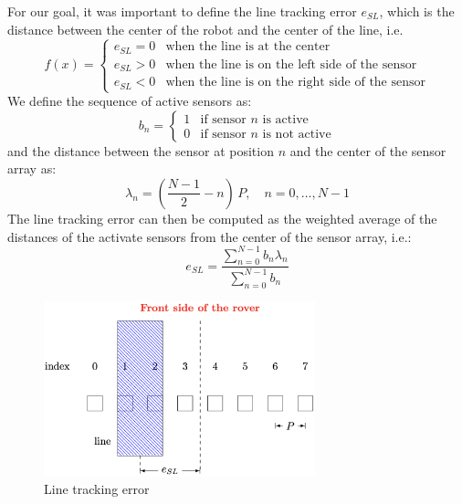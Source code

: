 For our goal, it was important to define the line tracking error $e_{SL}$, which is the distance between the center of the robot and the center of the line, i.e.
\begin{equation}
    f(x) = \left\{
    \begin{array}{ll}
        e_{SL} = 0 & \text{when the line is at the center} \\
        e_{SL} > 0 & \text{when the line is on the left side of the sensor} \\
        e_{SL} < 0 & \text{when the line is on the right side of the sensor}
    \end{array}
    \right.
\end{equation}
We define the sequence of active sensors as:
\begin{equation}
    b_n = 
    \begin{cases}
        1 & \text{if sensor $n$ is active} \\
        0 & \text{if sensor $n$ is not active}
    \end{cases}
\end{equation}
and the distance between the sensor at position $n$ and the center of the sensor array as:
\begin{equation}
    \lambda_n = \left( \frac{N-1}{2} - n \right) \, P, \quad n = 0, \ldots, N-1
\end{equation}
The line tracking error can then be computed as the weighted average of the distances of the activate sensors from the center of the sensor array, i.e.:
\begin{equation}
    e_{SL} = \frac{\sum_{n=0}^{N-1} b_n \lambda_n}{\sum_{n=0}^{N-1} b_n} 
\end{equation}

\begin{figure} [H]
    \centering
    \includegraphics[width=0.7\textwidth]{figures/e_sl.png}
    \caption{Line tracking error}
    \label{fig:line_tracking_error}
\end{figure}

